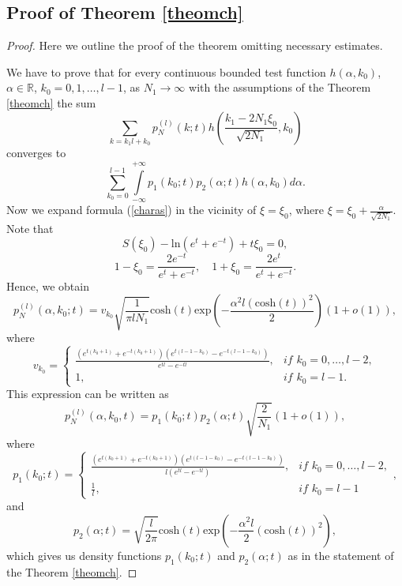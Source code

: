 \documentclass[11pt]{amsart}
\begin{document}
\subsection{Proof of Theorem \ref{theomch}}\label{approofchar}
\begin{proof}
    Here we outline the proof of the theorem omitting necessary estimates.

    We have to prove that for every continuous bounded test function $h(\alpha,k_0)$, $\alpha\in\mathbb{R}$, $k_0=0,1,\ldots,l-1$, as $N_1\to\infty$ with the assumptions of the Theorem \ref{theomch} the sum
    $$
    \sum\limits_{k=k_1l+k_0} p^{(l)}_N(k;t)h\left(\frac{k_1-2N_1 \xi_0}{\sqrt{2N_1}},k_0\right)
    $$
    converges to
    \begin{equation}\label{conv}
    \sum\limits_{k_0=0}^{l-1}\int\limits_{-\infty}^{+\infty}p_1(k_0;t)p_2(\alpha;t)h(\alpha,k_0)d\alpha.
    \end{equation}
    Now we expand formula (\ref{charas}) in the vicinity of $\xi=\xi_0$, where $\xi=\xi_0+\frac{\alpha}{\sqrt{2N_1}}$. Note that
    \begin{equation*}
		S(\xi_0)-\mathrm{ln}(e^t+e^{-t})+t\xi_0=0,
	\end{equation*}
	\begin{equation*}
		1-\xi_0=\frac{2e^{-t}}{e^t+e^{-t}},\quad 1+\xi_0=\frac{2e^{t}}{e^t+e^{-t}}.
	\end{equation*}
    Hence, we obtain
    \begin{equation*}
		p^{(l)}_N(\alpha,k_0;t)=v_{k_0}\sqrt{\frac{1}{\pi lN_1}}\mathrm{cosh}(t)\mathrm{exp}\left({-\frac{\alpha^2l(\mathrm{cosh}(t))^2}{2}}\right)\left(1+o\left(1\right)\right),
	\end{equation*}
	where
	\begin{equation*}
		v_{k_0}=\begin{cases}
			\frac{(e^{t(k_0+1)}+e^{-t(k_0+1)})(e^{t(l-1-k_0)}-e^{-t(l-1-k_0)})}{e^{tl}-e^{-tl}},& \textit{if $k_0=0,\ldots,l-2$},\\
			1,& \textit{if $k_0=l-1$}.
		\end{cases}
	\end{equation*}
	This expression can be written as
	\begin{equation*}
		p^{(l)}_N(\alpha,k_0,t)=p_1(k_0;t)p_2(\alpha;t)\sqrt{\frac{2}{N_1}}\left(1+o\left(1\right)\right),
	\end{equation*}
	where
	\begin{equation*}
		p_1(k_0;t)=\begin{cases}
			\frac{(e^{t(k_0+1)}+e^{-t(k_0+1)})(e^{t(l-1-k_0)}-e^{-t(l-1-k_0)})}{l(e^{tl}-e^{-tl})},& \textit{if $k_0=0,\ldots,l-2$},\\
			\frac{1}{l},& \textit{if $k_0=l-1$}
		\end{cases},
	\end{equation*}
	and
	\begin{equation*}
		p_2(\alpha;t)=\sqrt{\frac{l}{2\pi}}\mathrm{cosh}(t)\mathrm{exp}\left({-\frac{\alpha^2l}{2}\left(\mathrm{cosh}(t)\right)^2}\right),
	\end{equation*}
    which gives us density functions $p_1(k_0;t)$ and $p_2(\alpha;t)$ as in the statement of the Theorem \ref{theomch}.



\end{proof}
\end{document}
